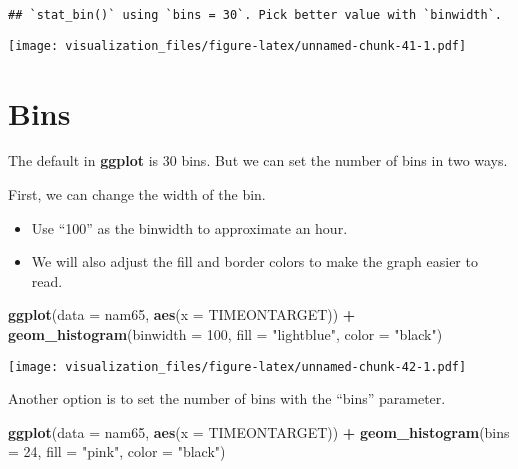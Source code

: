 \documentclass[oneside]{memoir}
\newenvironment{Shaded}{\begin{snugshade}}{\end{snugshade}}
\newcommand{\KeywordTok}[1]{\textcolor[rgb]{0.13,0.29,0.53}{\textbf{#1}}}
\newcommand{\DataTypeTok}[1]{\textcolor[rgb]{0.13,0.29,0.53}{#1}}
\newcommand{\DecValTok}[1]{\textcolor[rgb]{0.00,0.00,0.81}{#1}}
\newcommand{\StringTok}[1]{\textcolor[rgb]{0.31,0.60,0.02}{#1}}
\newcommand{\OperatorTok}[1]{\textcolor[rgb]{0.81,0.36,0.00}{\textbf{#1}}}
\newcommand{\NormalTok}[1]{#1}
\theoremstyle{definition}
\theoremstyle{definition}
\theoremstyle{definition}
\theoremstyle{remark}
\begin{document}
\begin{verbatim}
## `stat_bin()` using `bins = 30`. Pick better value with `binwidth`.
\end{verbatim}

\texttt{[image: visualization\_files/figure-latex/unnamed-chunk-41-1.pdf]}

\section{Bins}\label{bins}

The default in \textbf{ggplot} is 30 bins. But we can set the number of
bins in two ways.

First, we can change the width of the bin.

\begin{itemize}
\item
  Use ``100'' as the binwidth to approximate an hour.
\item
  We will also adjust the fill and border colors to make the graph
  easier to read.
\end{itemize}

\begin{Shaded}
\begin{Highlighting}[]
\KeywordTok{ggplot}\NormalTok{(}\DataTypeTok{data =}\NormalTok{ nam65, }\KeywordTok{aes}\NormalTok{(}\DataTypeTok{x =}\NormalTok{ TIMEONTARGET)) }\OperatorTok{+}
\StringTok{  }\KeywordTok{geom_histogram}\NormalTok{(}\DataTypeTok{binwidth =} \DecValTok{100}\NormalTok{, }\DataTypeTok{fill =} \StringTok{"lightblue"}\NormalTok{, }\DataTypeTok{color =} \StringTok{"black"}\NormalTok{)}
\end{Highlighting}
\end{Shaded}

\texttt{[image: visualization\_files/figure-latex/unnamed-chunk-42-1.pdf]}

Another option is to set the number of bins with the ``bins'' parameter.

\begin{Shaded}
\begin{Highlighting}[]
\KeywordTok{ggplot}\NormalTok{(}\DataTypeTok{data =}\NormalTok{ nam65, }\KeywordTok{aes}\NormalTok{(}\DataTypeTok{x =}\NormalTok{ TIMEONTARGET)) }\OperatorTok{+}
\StringTok{  }\KeywordTok{geom_histogram}\NormalTok{(}\DataTypeTok{bins =} \DecValTok{24}\NormalTok{, }\DataTypeTok{fill =} \StringTok{"pink"}\NormalTok{, }\DataTypeTok{color =} \StringTok{"black"}\NormalTok{)}
\end{Highlighting}
\end{Shaded}
\end{document}
